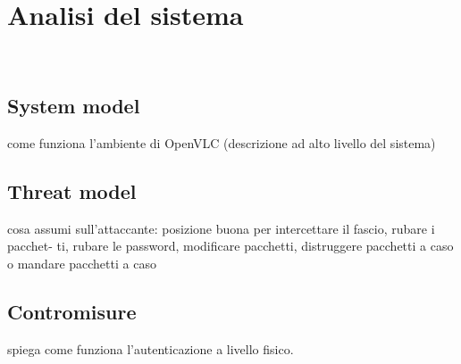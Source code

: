 \chapter{Analisi del sistema}
\label{cap:analisi}

\\

\section{System model}
come funziona l'ambiente di OpenVLC (descrizione ad alto livello del sistema)

\section{Threat model}
cosa assumi sull'attaccante: posizione buona per intercettare il fascio, rubare i pacchet-
ti, rubare le password, modificare pacchetti, distruggere pacchetti a caso o mandare
pacchetti a caso

\section{Contromisure}
spiega come funziona l'autenticazione a livello fisico.